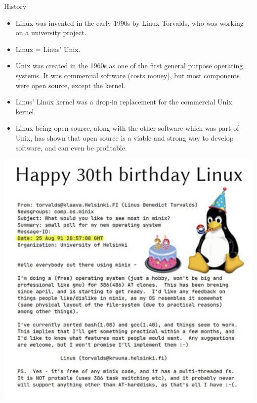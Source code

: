 \documentclass[graphics]{beamer}
\begin{document}
\begin{frame}{History}
     {
        \begin{itemize}
            \item Linux was invented in the early 1990s by Linux Torvalds, who was working on a university project.
            \item Linux = Linus' Unix.
            \item Unix was created in the 1960s as one of the first general purpose operating systems. It was commercial software (costs money), but most components were open source, except the kernel.
            \item Linus' Linux kernel was a drop-in replacement for the commercial Unix kernel.
            \item Linux being open source, along with the other software which was part of Unix, has shown that open source is a viable and strong way to develop software, and can even be profitable.
        \end{itemize}
    }
     {
        \includegraphics[scale=0.231]{Images/linux_birthday.jpg}
    }
\end{frame}
\end{document}
